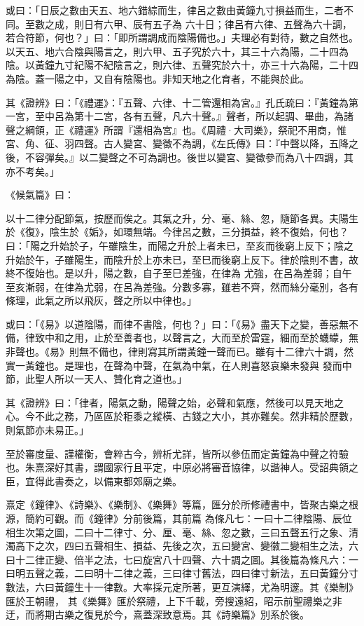\begin{pinyinscope}
 或曰：「日辰之數由天五、地六錯綜而生，律呂之數由黃鐘九寸損益而生，二者不同。至數之成，則日有六甲、辰有五子為
 六十日；律呂有六律、五聲為六十調，若合符節，何也？」曰：「即所謂調成而陰陽備也。」夫理必有對待，數之自然也。以天五、地六合陰與陽言之，則六甲、五子究於六十，其三十六為陽，二十四為陰。以黃鐘九寸紀陽不紀陰言之，則六律、五聲究於六十，亦三十六為陽，二十四為陰。蓋一陽之中，又自有陰陽也。非知天地之化育者，不能與於此。



 其《證辨》曰：「《禮運》：『五聲、六律、十二管還相為宮。』孔氏疏曰：『黃鐘為第一宮，至中呂為第十二宮，各有五聲，凡六十聲。』聲者，所以起調、畢曲，為諸聲之綱領，正《禮運》所謂『還相為宮』也。《周禮·大司樂》，祭祀不用商，惟
 宮、角、征、羽四聲。古人變宮、變徵不為調，《左氏傳》曰：『中聲以降，五降之後，不容彈矣。』以二變聲之不可為調也。後世以變宮、變徵參而為八十四調，其亦不考矣。」



 《候氣篇》曰：



 以十二律分配節氣，按歷而俟之。其氣之升，分、毫、絲、忽，隨節各異。夫陽生於《復》，陰生於《姤》，如環無端。今律呂之數，三分損益，終不復始，何也？曰：「陽之升始於子，午雖陰生，而陽之升於上者未已，至亥而後窮上反下；陰之升始於午，子雖陽生，而陰升於上亦未已，至巳而後窮上反下。律於陰則不書，故終不復始也。是以升，陽之數，自子至巳差強，在律為
 尤強，在呂為差弱；自午至亥漸弱，在律為尤弱，在呂為差強。分數多寡，雖若不齊，然而絲分毫別，各有條理，此氣之所以飛灰，聲之所以中律也。」



 或曰：「《易》以道陰陽，而律不書陰，何也？」曰：「《易》盡天下之變，善惡無不備，律致中和之用，止於至善者也，以聲言之，大而至於雷霆，細而至於蠛蠓，無非聲也。《易》則無不備也，律則寫其所謂黃鐘一聲而已。雖有十二律六十調，然實一黃鐘也。是理也，在聲為中聲，在氣為中氣，在人則喜怒哀樂未發與
 發而中節，此聖人所以一天人、贊化育之道也。」



 其《證辨》曰：「律者，陽氣之動，陽聲之始，必聲和氣應，然後可以見天地之心。今不此之務，乃區區於秬黍之縱橫、古錢之大小，其亦難矣。然非精於歷數，則氣節亦未易正。」



 至於審度量、謹權衡，會粹古今，辨析尤詳，皆所以參伍而定黃鐘為中聲之符驗也。朱熹深好其書，謂國家行且平定，中原必將審音協律，以諧神人。受詔典領之臣，宜得此書奏之，以備東都郊廟之樂。



 熹定《鐘律》、《詩樂》、《樂制》、《樂舞》等篇，匯分於所修禮書中，皆聚古樂之根源，簡約可觀。而《鐘律》分前後篇，其前篇
 為條凡七：一曰十二律陰陽、辰位相生次第之圖，二曰十二律寸、分、厘、毫、絲、忽之數，三曰五聲五行之象、清濁高下之次，四曰五聲相生、損益、先後之次，五曰變宮、變徽二變相生之法，六曰十二律正變、倍半之法，七曰旋宮八十四聲、六十調之圖。其後篇為條凡六：一曰明五聲之義，二曰明十二律之義，三曰律寸舊法，四曰律寸新法，五曰黃鐘分寸數法，六曰黃鐘生十一律數。大率採元定所著，更互演繹，尤為明邃。其《樂制》匯於王朝禮，
 其《樂舞》匯於祭禮，上下千載，旁搜遠紹，昭示前聖禮樂之非迂，而將期古樂之復見於今，熹蓋深致意焉。其《詩樂篇》別系於後。



\end{pinyinscope}